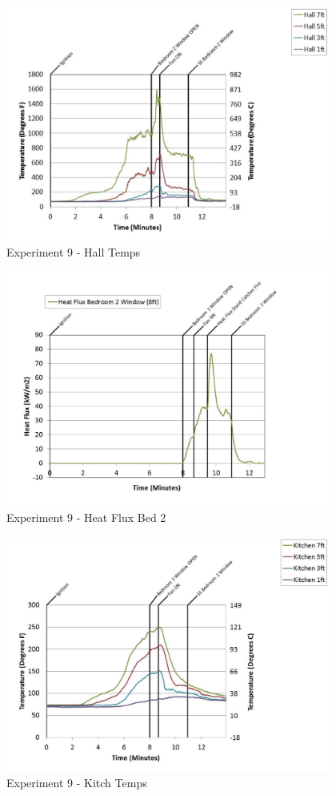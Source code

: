 \documentclass{article}
\begin{document}
\begin{appendices}
	\begin{figure}[h!]
		\centering
		\includegraphics[height=3.05in]{0_Images/Results_Charts/Exp_9_Charts/HallTemps.pdf}
		\caption{Experiment 9 - Hall Temps}
	\end{figure}
 
	\clearpage

	\begin{figure}[h!]
		\centering
		\includegraphics[height=3.05in]{0_Images/Results_Charts/Exp_9_Charts/HeatFluxBed2.pdf}
		\caption{Experiment 9 - Heat Flux Bed 2}
	\end{figure}
 

	\begin{figure}[h!]
		\centering
		\includegraphics[height=3.05in]{0_Images/Results_Charts/Exp_9_Charts/KitchTemps.pdf}
		\caption{Experiment 9 - Kitch Temps}
	\end{figure}
 

\end{appendices}
\end{document}
